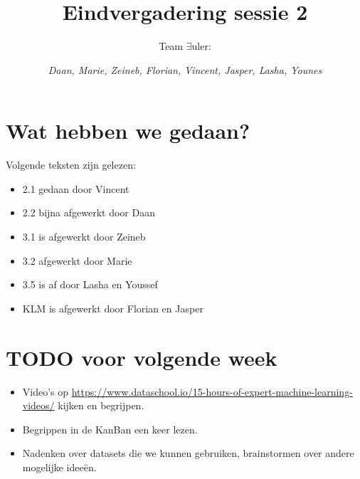 \documentclass{article}
\title{Eindvergadering sessie 2}
\author{Team $\exists$uler: \and
	\textit{Daan, Marie, Zeineb, Florian, Vincent, Jasper, Lasha, Younes}}
\begin{document}
\maketitle

\section{Wat hebben we gedaan?}

Volgende teksten zijn gelezen:
\begin{itemize}
	\item 2.1 gedaan door Vincent
	\item 2.2 bijna afgewerkt door Daan
	\item 3.1 is afgewerkt door Zeineb
	\item 3.2 afgewerkt door Marie
	\item 3.5 is af door Lasha en Youssef
	\item KLM is afgewerkt door Florian en Jasper
\end{itemize}

\section{TODO voor volgende week}

\begin{itemize}
	\item Video’s op \href{https://www.dataschool.io/15-hours-of-expert-machine-learning-videos/}{https://www.dataschool.io/15-hours-of-expert-machine-learning-videos/} kijken en begrijpen.
	\item Begrippen in de KanBan een keer lezen.
	\item Nadenken over datasets die we kunnen gebruiken, brainstormen over andere mogelijke ideeën.
\end{itemize}
\end{document}

